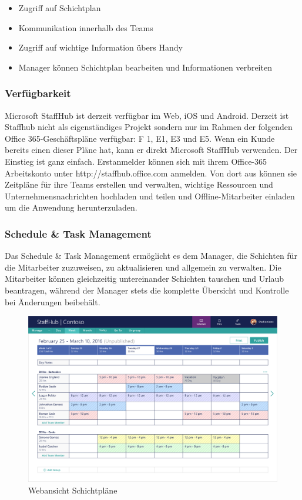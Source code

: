 \begin{itemize}
\item Zugriff auf Schichtplan
\item Kommunikation innerhalb des Teams
\item Zugriff auf wichtige Information übers Handy
\item Manager können Schichtplan bearbeiten und Informationen verbreiten
\end{itemize}

\subsubsection{Verfügbarkeit}
Microsoft StaffHub ist derzeit verfügbar im Web, iOS und Android. Derzeit ist Staffhub nicht als eigenständiges Projekt sondern nur im Rahmen der folgenden Office 365-Geschäftspläne verfügbar: F 1, E1, E3 und E5. Wenn ein Kunde bereits einen dieser Pläne hat, kann er direkt Microsoft StaffHub verwenden. Der Einstieg ist ganz einfach. Erstanmelder können sich mit ihrem Office-365 Arbeitskonto unter http://staffhub.office.com anmelden. Von dort aus können sie Zeitpläne für ihre Teams erstellen und verwalten, wichtige Ressourcen und Unternehmensnachrichten hochladen und teilen und Offline-Mitarbeiter einladen um die Anwendung herunterzuladen.

\subsubsection{Schedule \& Task Management}
Das Schedule \& Task Management ermöglicht es dem Manager, die Schichten für die Mitarbeiter zuzuweisen, zu aktualisieren und allgemein zu verwalten. Die Mitarbeiter können gleichzeitig untereinander Schichten tauschen und Urlaub beantragen, während der Manager stets die komplette Übersicht und Kontrolle bei Änderungen beibehält. 

\begin{figure}[H] 
\centering 
\includegraphics[scale=0.48]{images/schedule} 
\caption[Webansicht Schichtpläne]{Webansicht Schichtpläne\protect} 
\label{ws} 
\end{figure}

